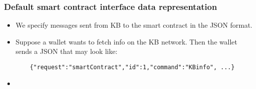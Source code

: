 \begin{frame}[fragile]
\frametitle{Default smart contract interface data representation}
\begin{itemize}
	\item We specify messages sent from KB to the smart contract in the JSON format. 
	\item Suppose a wallet wants to fetch info on the KB network. Then the wallet sends a JSON that may look like:
	\begin{verbatim}
	{"request":"smartContract","id":1,"command":"KBinfo", ...}
	\end{verbatim}
	\item 
	\end{itemize}
\end{frame}